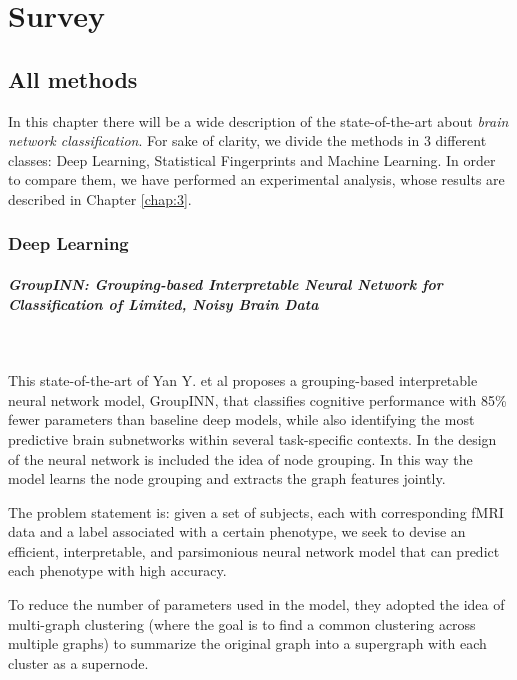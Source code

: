 \chapter{Survey}
\label{chap:2} 

\section{All methods}
In this chapter there will be a wide description of the state-of-the-art about \textit{brain network classification}. For sake of clarity, we divide the methods in 3 different classes: Deep Learning, Statistical Fingerprints and Machine Learning. In order to compare them, we have performed an experimental analysis, whose results are described in Chapter \ref{chap:3}.

\subsection{Deep Learning}
\paragraph{GroupINN: Grouping-based Interpretable Neural Network for Classification of Limited, Noisy Brain Data}\
\vspace{0.5cm}

This state-of-the-art of Yan Y. et al \cite{groupinn} proposes a grouping-based interpretable neural network model, GroupINN, that classifies cognitive performance with 85\% fewer parameters than baseline deep models, while also identifying the most predictive brain subnetworks within several task-specific contexts. In the design of the neural network is included the idea of node grouping. In this way the model learns the node grouping and extracts the graph features jointly.
\vspace{0.5cm}

The problem statement is: given a set of subjects, each with corresponding fMRI data and a label associated with a certain phenotype, we seek to devise an efficient, interpretable, and parsimonious neural network model that can predict each phenotype with high accuracy.
\vspace{0.5cm}

To reduce the number of parameters used in the model, they adopted the idea of multi-graph clustering (where the goal is to find a common clustering across multiple graphs) to summarize the original graph into a supergraph with each cluster as a supernode. 
\vspace{0.5cm}

